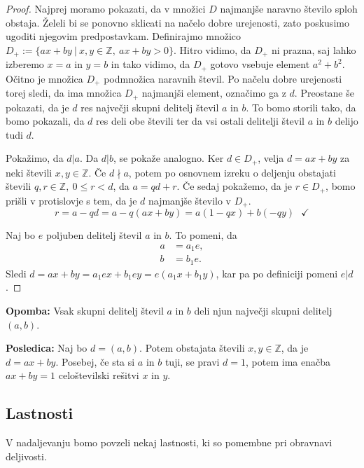 \documentclass[12pt, a4paper]{article}
\newenvironment{opom}[1][]{\par\medskip\noindent \textbf{Opomba: }}{\medskip}
\newenvironment{posl}[1][]{\par\medskip\noindent \textbf{Posledica: }}{\medskip}
\begin{document}
\begin{proof}
Najprej moramo pokazati, da v množici $D$ najmanjše naravno število sploh obstaja. Želeli bi se ponovno sklicati na načelo dobre urejenosti, zato poskusimo ugoditi njegovim predpostavkam. Definirajmo množico \mbox{$D_+ := \{ax+by\ | \ x,y\in \mathbb{Z},\ ax+by>0\}$.} Hitro vidimo, da $D_+$ ni prazna, saj lahko izberemo $x=a$ in $y=b$ in tako vidimo, da $D_+$ gotovo vsebuje element $a^2 + b^2$. Očitno je množica $D_+$ podmnožica naravnih števil. Po načelu dobre urejenosti torej sledi, da ima množica $D_+$ najmanjši element, označimo ga z $d$. Preostane še pokazati, da je $d$ res največji skupni delitelj števil $a$ in $b$. To bomo storili tako, da bomo pokazali, da $d$ res deli obe števili ter da vsi ostali delitelji števil $a$ in $b$ delijo tudi $d$.

Pokažimo, da $d|a$. Da $d|b$, se pokaže analogno. Ker $d \in D_+$, velja $d=ax+by$ za neki števili $x,y\in \mathbb{Z}$. Če $d\nmid a$, potem po osnovnem izreku o deljenju obstajati števili $q,r\in \mathbb{Z},\ 0\leq r< d$, da $a=qd+r$. Če sedaj pokažemo, da je $r\in D_+$, bomo prišli v protislovje s tem, da je $d$ najmanjše število v $D_+$. 
$$r= a-qd=a-q(ax+by)=a(1-qx) + b(-qy)\ \ \ \checkmark $$

Naj bo $e$ poljuben delitelj števil $a$ in $b$. To pomeni, da 
\begin{align*}
a&=a_1 e, \\
b&=b_1 e.
\end{align*}
Sledi $d=ax+by=a_1 ex + b_1 ey=e(a_1 x + b_1 y)$, kar pa po definiciji pomeni $e|d$.
\end{proof}

\begin{opom}
Vsak skupni delitelj števil $a$ in $b$ deli njun največji skupni delitelj $(a,b)$.
\end{opom}

\begin{posl}
Naj bo $d=(a,b)$. Potem obstajata števili $x,y\in \mathbb{Z}$, da je $d=ax+by$. Posebej, če sta si $a$ in $b$ tuji, se pravi $d=1$, potem ima enačba $ax+by=1$ celoštevilski rešitvi $x$ in $y$.
\end{posl}

\subsection{Lastnosti}

V nadaljevanju bomo povzeli nekaj lastnosti, ki so pomembne pri obravnavi deljivosti.
\end{document}
